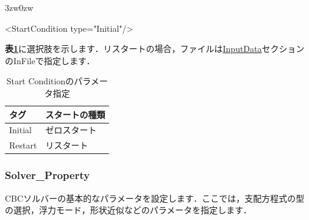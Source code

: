 \begin{indentation}{3zw}{0zw}

{\small
\begin{program}
<StartCondition type="Initial"/>
\end{program}
}

\textbf{表\ref{tbl:start}}に選択肢を示します．リスタートの場合，ファイルは\hyperlink{tgt:input_data}{InputData}セクションのInFileで指定します．

\begin{table}[htdp]
\caption{Start Conditionのパラメータ指定}
\begin{center}
\small
\begin{tabular}{ll} \toprule
タグ & スタートの種類\\ \midrule
Initial & ゼロスタート\\
Restart & リスタート\\ \bottomrule
\end{tabular}
\end{center}
\label{tbl:start}
\end{table}

\end{indentation}



\pagebreak
\subsubsection{Solver\_Property}

CBCソルバーの\hypertarget{tgt:solver_property}{基本的なパラメータ}を設定します．ここでは，支配方程式の型の選択，浮力モード，形状近似などのパラメータを指定します．


